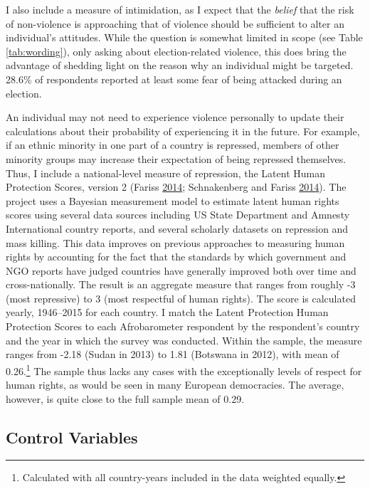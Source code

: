 \documentclass[12pt,]{book}
\let\rmarkdownfootnote\footnote%
\def\footnote{\protect\rmarkdownfootnote}
\theoremstyle{definition}
\theoremstyle{definition}
\theoremstyle{definition}
\theoremstyle{remark}
\begin{document}
I also include a measure of intimidation, as I expect that the
\emph{belief} that the risk of non-violence is approaching that of
violence should be sufficient to alter an individual's attitudes. While
the question is somewhat limited in scope (see Table \ref{tab:wording}),
only asking about election-related violence, this does bring the
advantage of shedding light on the reason why an individual might be
targeted. 28.6\% of respondents reported at least some fear of being
attacked during an election.

An individual may not need to experience violence personally to update
their calculations about their probability of experiencing it in the
future. For example, if an ethnic minority in one part of a country is
repressed, members of other minority groups may increase their
expectation of being repressed themselves. Thus, I include a
national-level measure of repression, the Latent Human Protection
Scores, version 2 (Fariss \protect\hyperlink{ref-Fariss2014}{2014};
Schnakenberg and Fariss \protect\hyperlink{ref-Schnakenberg2014}{2014}).
The project uses a Bayesian measurement model to estimate latent human
rights scores using several data sources including US State Department
and Amnesty International country reports, and several scholarly
datasets on repression and mass killing. This data improves on previous
approaches to measuring human rights by accounting for the fact that the
standards by which government and NGO reports have judged countries have
generally improved both over time and cross-nationally. The result is an
aggregate measure that ranges from roughly -3 (most repressive) to 3
(most respectful of human rights). The score is calculated yearly,
1946--2015 for each country. I match the Latent Protection Human
Protection Scores to each Afrobarometer respondent by the respondent's
country and the year in which the survey was conducted. Within the
sample, the measure ranges from -2.18 (Sudan in 2013) to 1.81 (Botswana
in 2012), with mean of 0.26.\footnote{Calculated with all country-years
  included in the data weighted equally.} The sample thus lacks any
cases with the exceptionally levels of respect for human rights, as
would be seen in many European democracies. The average, however, is
quite close to the full sample mean of 0.29.

\hypertarget{control-variables}{%
\subsection{Control Variables}\label{control-variables}}
\end{document}
